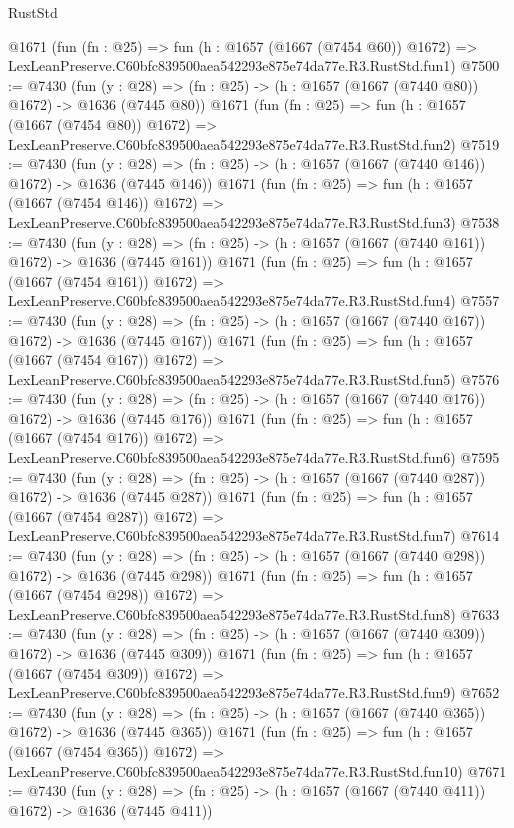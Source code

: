 \begin{lexlean}{RustStd}
\begin{coremodule}
    @1671
    (fun (fn : @25) =>
    fun (h : @1657 (@1667 (@7454 @60)) @1672) =>
    LexLeanPreserve.C60bfc839500aea542293e875e74da77e.R3.RustStd.fun1)
@7500 := @7430
    (fun (y : @28) => (fn : @25) -> (h : @1657 (@1667 (@7440 @80)) @1672) -> @1636 (@7445 @80))
    @1671
    (fun (fn : @25) =>
    fun (h : @1657 (@1667 (@7454 @80)) @1672) =>
    LexLeanPreserve.C60bfc839500aea542293e875e74da77e.R3.RustStd.fun2)
@7519 := @7430
    (fun (y : @28) => (fn : @25) -> (h : @1657 (@1667 (@7440 @146)) @1672) -> @1636 (@7445 @146))
    @1671
    (fun (fn : @25) =>
    fun (h : @1657 (@1667 (@7454 @146)) @1672) =>
    LexLeanPreserve.C60bfc839500aea542293e875e74da77e.R3.RustStd.fun3)
@7538 := @7430
    (fun (y : @28) => (fn : @25) -> (h : @1657 (@1667 (@7440 @161)) @1672) -> @1636 (@7445 @161))
    @1671
    (fun (fn : @25) =>
    fun (h : @1657 (@1667 (@7454 @161)) @1672) =>
    LexLeanPreserve.C60bfc839500aea542293e875e74da77e.R3.RustStd.fun4)
@7557 := @7430
    (fun (y : @28) => (fn : @25) -> (h : @1657 (@1667 (@7440 @167)) @1672) -> @1636 (@7445 @167))
    @1671
    (fun (fn : @25) =>
    fun (h : @1657 (@1667 (@7454 @167)) @1672) =>
    LexLeanPreserve.C60bfc839500aea542293e875e74da77e.R3.RustStd.fun5)
@7576 := @7430
    (fun (y : @28) => (fn : @25) -> (h : @1657 (@1667 (@7440 @176)) @1672) -> @1636 (@7445 @176))
    @1671
    (fun (fn : @25) =>
    fun (h : @1657 (@1667 (@7454 @176)) @1672) =>
    LexLeanPreserve.C60bfc839500aea542293e875e74da77e.R3.RustStd.fun6)
@7595 := @7430
    (fun (y : @28) => (fn : @25) -> (h : @1657 (@1667 (@7440 @287)) @1672) -> @1636 (@7445 @287))
    @1671
    (fun (fn : @25) =>
    fun (h : @1657 (@1667 (@7454 @287)) @1672) =>
    LexLeanPreserve.C60bfc839500aea542293e875e74da77e.R3.RustStd.fun7)
@7614 := @7430
    (fun (y : @28) => (fn : @25) -> (h : @1657 (@1667 (@7440 @298)) @1672) -> @1636 (@7445 @298))
    @1671
    (fun (fn : @25) =>
    fun (h : @1657 (@1667 (@7454 @298)) @1672) =>
    LexLeanPreserve.C60bfc839500aea542293e875e74da77e.R3.RustStd.fun8)
@7633 := @7430
    (fun (y : @28) => (fn : @25) -> (h : @1657 (@1667 (@7440 @309)) @1672) -> @1636 (@7445 @309))
    @1671
    (fun (fn : @25) =>
    fun (h : @1657 (@1667 (@7454 @309)) @1672) =>
    LexLeanPreserve.C60bfc839500aea542293e875e74da77e.R3.RustStd.fun9)
@7652 := @7430
    (fun (y : @28) => (fn : @25) -> (h : @1657 (@1667 (@7440 @365)) @1672) -> @1636 (@7445 @365))
    @1671
    (fun (fn : @25) =>
    fun (h : @1657 (@1667 (@7454 @365)) @1672) =>
    LexLeanPreserve.C60bfc839500aea542293e875e74da77e.R3.RustStd.fun10)
@7671 := @7430
    (fun (y : @28) => (fn : @25) -> (h : @1657 (@1667 (@7440 @411)) @1672) -> @1636 (@7445 @411))

\end{coremodule}
\end{lexlean}
